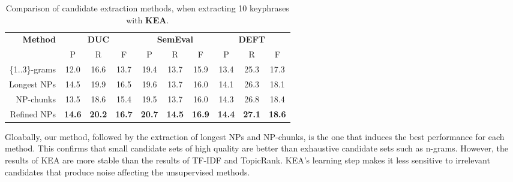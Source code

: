       \begin{table}
        \centering
        \begin{tabular}{rccccccccc}
          \toprule
          \multirow{2}{*}[-2pt]{\textbf{Method}} & \multicolumn{3}{c}{\textbf{DUC}} & \multicolumn{3}{c}{\textbf{SemEval}} & \multicolumn{3}{c}{\textbf{DEFT}}\\
          \cmidrule(r){2-4}\cmidrule(lr){5-7}\cmidrule(l){8-10}
          & P & R & F & P & R & F & P & R & F\\
          \midrule
          \{1..3\}-grams & 12.0 & 16.6 & 13.7 & 19.4 & 13.7 & 15.9 & 13.4 & 25.3 & 17.3\\
          Longest NPs & 14.5 & 19.9 & 16.5 & 19.6 & 13.7 & 16.0 & 14.1 & 26.3 & 18.1\\
          NP-chunks & 13.5 & 18.6 & 15.4 & 19.5 & 13.7 & 16.0 & 14.3 & 26.8 & 18.4\\
          Refined NPs & \textbf{14.6} & \textbf{20.2} & \textbf{16.7} & \textbf{20.7} & \textbf{14.5} & \textbf{16.9} & \textbf{14.4} & \textbf{27.1} & \textbf{18.6}\\
          \bottomrule
        \end{tabular}
        \caption{Comparison of candidate extraction methods, when extracting 10
                 keyphrases with \textbf{KEA}.
                 \label{tab:kea_results}}
      \end{table}
      
      Gloabally, our method, followed by the extraction of longest NPs and
      NP-chunks, is the one that induces the best performance for each method.
      This confirms that small candidate sets of high quality are better than
      exhaustive candidate sets such as n-grams. However, the results of KEA are
      more stable than the results of TF-IDF and TopicRank. KEA's learning step
      makes it less sensitive to irrelevant candidates that produce noise
      affecting the unsupervised methods. 

